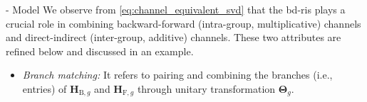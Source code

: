 \documentclass[journal]{IEEEtran}
\newtheorem{remark}{Remark}
\begin{document}
\begin{section}{- Model}
	We observe from \eqref{eq:channel_equivalent_svd} that the \gls{bd}-\gls{ris} plays a crucial role in combining
	backward-forward (intra-group, multiplicative) channels and direct-indirect (inter-group, additive) channels.
	These two attributes are refined below and discussed in an example.
	\begin{itemize}
		\item \emph{Branch matching:} It refers to pairing and combining the branches (i.e., entries) of $\mathbf{H}_{\mathrm{B},g}$ and $\mathbf{H}_{\mathrm{F},g}$ through unitary transformation $\mathbf{\Theta}_g$.

\end{itemize}
\end{section}
\end{document}

